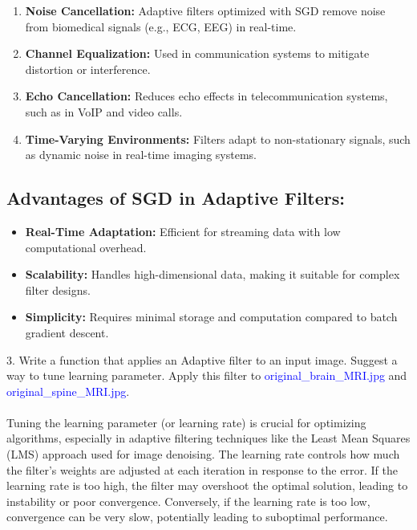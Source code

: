 \documentclass[hidelinks,12pt]{article}
\begin{document}
	\begin{enumerate}
		\item \textbf{Noise Cancellation:} Adaptive filters optimized with SGD remove noise from biomedical signals (e.g., ECG, EEG) in real-time.
		\item \textbf{Channel Equalization:} Used in communication systems to mitigate distortion or interference.
		\item \textbf{Echo Cancellation:} Reduces echo effects in telecommunication systems, such as in VoIP and video calls.
		\item \textbf{Time-Varying Environments:} Filters adapt to non-stationary signals, such as dynamic noise in real-time imaging systems.
	\end{enumerate}
	
	\pagebreak
	
	\subsection*{Advantages of SGD in Adaptive Filters:}
	\begin{itemize}
		\item \textbf{Real-Time Adaptation:} Efficient for streaming data with low computational overhead.
		\item \textbf{Scalability:} Handles high-dimensional data, making it suitable for complex filter designs.
		\item \textbf{Simplicity:} Requires minimal storage and computation compared to batch gradient descent.
	\end{itemize}
	
	3. Write a function that applies an Adaptive filter to an input image. Suggest a way to tune learning parameter. Apply this filter to \textcolor{blue}{original\_brain\_MRI.jpg} and \textcolor{blue}{original\_spine\_MRI.jpg}.
	\\ \\
	
	Tuning the learning parameter (or learning rate) is crucial for optimizing algorithms, especially in adaptive filtering techniques like the Least Mean Squares (LMS) approach used for image denoising. The learning rate controls how much the filter’s weights are adjusted at each iteration in response to the error. If the learning rate is too high, the filter may overshoot the optimal solution, leading to instability or poor convergence. Conversely, if the learning rate is too low, convergence can be very slow, potentially leading to suboptimal performance.
	
\end{document}
